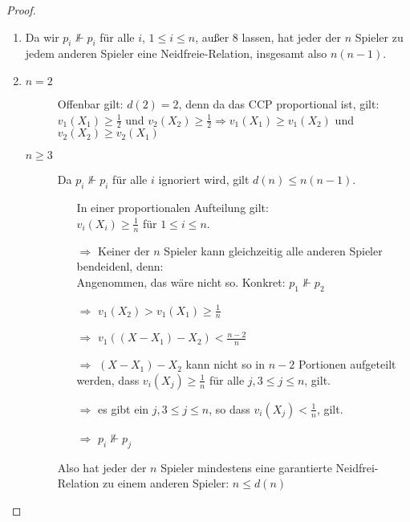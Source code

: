 \documentclass[a4paper,10pt]{scrartcl}
\begin{document}
\begin{proof}
 \begin{enumerate}
  \item Da wir $p_i\nVdash p_i$ für alle $i$, $1\leq i\leq n$, außer 8 lassen, hat jeder der $n$ Spieler zu jedem anderen Spieler eine
        Neidfreie-Relation, insgesamt also $n(n-1)$.
  \item \begin{description}
         \item[$n=2$] Offenbar gilt: $d(2)=2$, denn da das CCP proportional ist, gilt: $v_1(X_1)\geq\frac{1}{2}$ und $v_2(X_2)\geq\frac{1}{2}
                    \Rightarrow v_1(X_1)\geq v_1(X_2)$ und $v_2(X_2)\geq v_2(X_1)$
         \item[$n\geq3$] Da $p_i\nVdash p_i$ für alle $i$ ignoriert wird, gilt $d(n)\leq n(n-1)$.
                         \begin{itemize}
                          \item[] In einer proportionalen Aufteilung gilt:\\$v_i(X_i)\geq\frac{1}{n}$ für $1\leq i\leq n$.\\
                          \item[$\Rightarrow$] Keiner der $n$ Spieler kann gleichzeitig alle anderen Spieler bendeidenl, denn:\\
                                               Angenommen, das wäre nicht so. Konkret: $p_1\nVdash p_2$
                          \item[$\Rightarrow$]$v_1(X_2)>v_1(X_1)\geq\frac{1}{n}$
                          \item[$\Rightarrow$]$v_1((X-X_1)-X_2)<\frac{n-2}{n}$
                          \item[$\Rightarrow$]$(X-X_1)-X_2$ kann nicht so in $n-2$ Portionen aufgeteilt werden, dass $v_i(X_j)\geq\frac{1}{n}$
                                              für alle $j,3\leq j\leq n$, gilt.
                          \item[$\Rightarrow$]es gibt ein $j,3\leq j\leq n$, so dass $v_i(X_j)<\frac{1}{n}$, gilt.
                          \item[$\Rightarrow$]$p_i\nVdash p_j$
                         \end{itemize}
                         Also hat jeder der $n$ Spieler mindestens eine garantierte Neidfrei-Relation zu einem anderen Spieler: $n\leq d(n)$  
        \end{description}
 \end{enumerate}
\end{proof}
\end{document}
